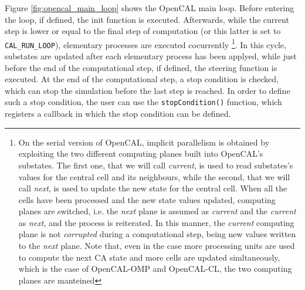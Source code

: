 Figure \ref{fig:opencal_main_loop} shows the OpenCAL main loop. Before
entering the loop, if defined, the init function is
executed. Afterwards, while the current step is lower or equal to the
final step of computation (or this latter is set to
\verb'CAL_RUN_LOOP'), elementary processes are executed
cocurrently \footnote{On the serial version of OpenCAL, implicit
  parallelism is obtained by exploiting the two different computing
  planes built into OpenCAL's substates. The first one, that we will
  call \emph{current}, is used to read substates's values for the
  central cell and its neighbours, while the second, that we will call
  \emph{next}, is used to update the new state for the central
  cell. When all the cells have been processed and the new state
  values updated, computing planes are switched, i.e. the \emph{next}
  plane is assumed as \emph{current} and the \emph{current} as
  \emph{next}, and the process is reiterated. In this manner, the
  \emph{current} computing plane is not \emph{corrupted} during a
  computational step, being new values written to the \emph{next}
  plane. Note that, even in the case more processing units are used to
  compute the next CA state and more cells are updated simltaneously,
  which is the case of OpenCAL-OMP and OpenCAL-CL, the two computing
  planes are manteined}. In this cycle, substates are updated after
each elementary process has been applyed, while just before the end of
the computational step, if defined, the steering function is
executed. At the end of the computational step, a stop condition is
checked, which can stop the simulation before the last step is
reached. In order to define such a stop condition, the user can use
the \verb'stopCondition()' function, which registers a callback in
which the stop condition can be defined.

